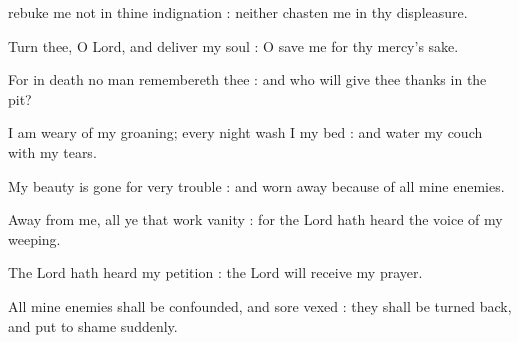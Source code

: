  rebuke me not in thine indignation : neither chasten me in thy displeasure.\par
{}
Turn thee, O Lord, and deliver my soul : O save me for thy mercy's sake.\par
{}For in death no man remembereth thee : and who will give thee thanks in the pit?\par
{}I am weary of my groaning; every night wash I my bed : and water my couch with my tears.\par
{}My beauty is gone for very trouble : and worn away because of all mine enemies.\par
{}Away from me, all ye that work vanity : for the Lord hath heard the voice of my weeping.\par
{}The Lord hath heard my petition : the Lord will receive my prayer.\par
{}All mine enemies shall be confounded, and sore vexed : they shall be turned back, and put to shame suddenly.\par


